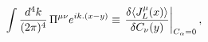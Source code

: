 \begin{equation}
\int {{d^4k}\over{(2\pi)^4}}\, \Pi^{\mu\nu}{e^{ik.(x-y)}} \equiv
\left.{{\delta \langle J^{\mu}_L(x)\rangle}\over{\delta
C_{\nu}(y)}} \right|_{C_\alpha =0},
\end{equation}

